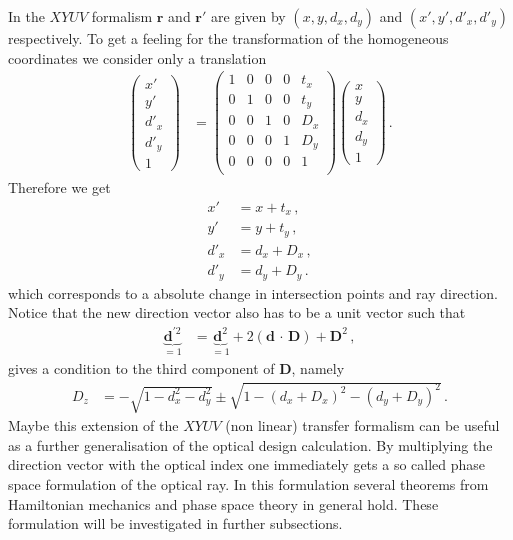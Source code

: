 \documentclass[12pt,a4paper,twoside,openright,BCOR10mm,headsepline,titlepage,abstracton,chapterprefix,final]{scrreprt}
\newcommand\Vector[1]{{\mathbf{#1}}}
\newcommand{\scpm}[2]{(#1\,\cdot\,#2)}
\begin{document}
In the $XYUV$ formalism $\Vector{r}$ and $\Vector{r}'$ are given by $(x,y,d_x,d_y)$ and $(x',y',{d'}_x,{d'}_y)$
respectively. To get a feeling for the transformation of the homogeneous coordinates we consider only
a translation
\begin{align}
 \begin{pmatrix} x' \\ y' \\ {d'}_x \\ {d'}_y \\ 1 \end{pmatrix} &=
 \begin{pmatrix} 1 & 0 & 0 & 0 & t_x \\
                 0 & 1 & 0 & 0 & t_y \\
                 0 & 0 & 1 & 0 & D_x \\
                 0 & 0 & 0 & 1 & D_y \\
                 0 & 0 & 0 & 0 & 1 \\
 \end{pmatrix}
 \begin{pmatrix} x \\ y \\ d_x \\ d_y \\ 1 \end{pmatrix}\,.
\end{align}
Therefore we get
\begin{subequations}
\begin{align}
 x' &= x + t_x\,,\\
 y' &= y + t_y\,,\\
 {d'}_x &= d_x + D_x\,,\\
 {d'}_y &= d_y + D_y\,.
\end{align}
\end{subequations}
which corresponds to a absolute change in intersection points and ray direction.
Notice that the new direction vector also has to be a unit vector such that
\begin{align}
 \underbrace{{\Vector{d}}^{\prime 2}}_{=1} &= \underbrace{\Vector{d}^2}_{=1} + 2 \scpm{\Vector{d}}{\Vector{D}} + \Vector{D}^2\,,
\end{align}
gives a condition to the third component of $\Vector{D}$, namely
\begin{align}
 D_z &= -\sqrt{1 - d_x^2 - d_y^2} \pm \sqrt{1 - (d_x + D_x)^2 - (d_y + D_y)^2}\,.
\end{align}
Maybe this extension of the $XYUV$ (non linear) transfer formalism can be useful as a further generalisation of
the optical design calculation. By multiplying the direction vector with the optical index one immediately gets
a so called phase space formulation of the optical ray. In this formulation several theorems from Hamiltonian
mechanics and phase space theory in general hold. These formulation will be investigated in further subsections.
\end{document}

